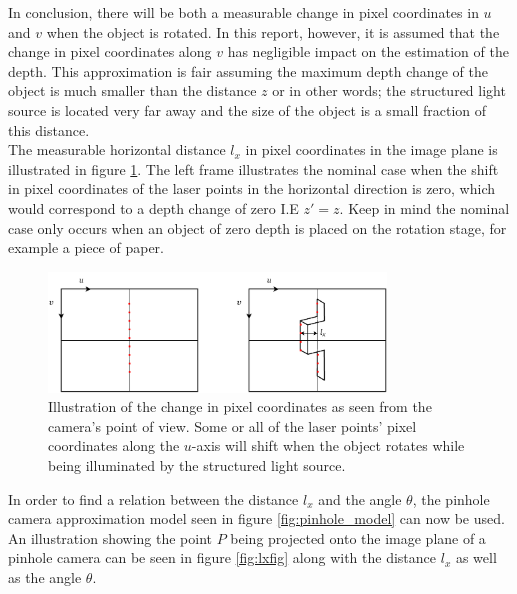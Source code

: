 In conclusion, there will be both a measurable change in pixel coordinates in $u$ and $v$ when the object is rotated. In this report, however, it is assumed that the change in pixel coordinates along $v$ has negligible impact on the estimation of the depth. This approximation is fair assuming the maximum depth change of the object is much smaller than the distance $z$ or in other words; the structured light source is located very far away and the size of the object is a small fraction of this distance.\\

The measurable horizontal distance $l_{x}$ in pixel coordinates in the image plane is illustrated in figure \ref{fig:2frames}. The left frame illustrates the nominal case when the shift in pixel coordinates of the laser points in the horizontal direction is zero, which would correspond to a depth change of zero I.E $z' = z$. Keep in mind the nominal case only occurs when an object of zero depth is placed on the rotation stage, for example a piece of paper.  

\begin{figure}[h]
    \centering
    \includegraphics[width=0.8\textwidth]{figures/reconstruction/2frames.pdf}
    \caption{Illustration of the change in pixel coordinates as seen from the camera's point of view. Some or all of the laser points' pixel coordinates along the $u$-axis will shift when the object rotates while being illuminated by the structured light source.}
    \label{fig:2frames}
\end{figure}

In order to find a relation between the distance $l_{x}$ and the angle $\theta$, the pinhole camera approximation model seen in figure \ref{fig:pinhole_model} can now be used. An illustration showing the point $P$ being projected onto the image plane of a pinhole camera can be seen in figure \ref{fig:lxfig} along with the distance $l_{x}$ as well as the angle $\theta$.\\  

